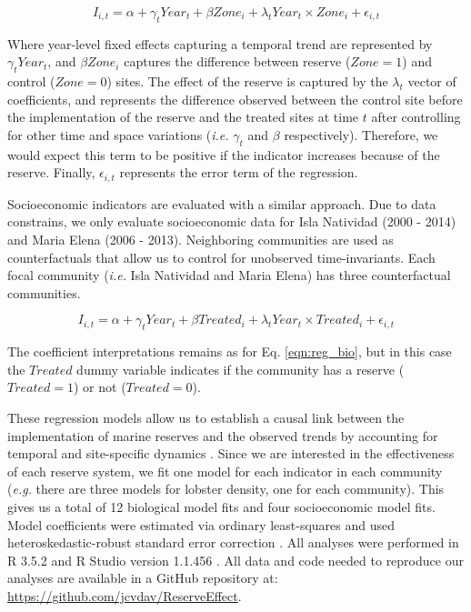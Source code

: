 \documentclass[10pt,letterpaper]{article}
\begin{document}
\begin{equation}
I_{i,t} = \alpha + \gamma_{t} Year_t + \beta Zone_i + \lambda_{t} Year_t\times Zone_i + \epsilon_{i,t}
\label{eqn:reg_bio}
\end{equation}

Where year-level fixed effects capturing a temporal trend are represented by $\gamma_t Year_t$, and $\beta Zone_i$ captures the difference between reserve ($Zone = 1$) and control ($Zone = 0$) sites. The effect of the reserve is captured by the $\lambda_t$ vector of coefficients, and represents the difference observed between the control site before the implementation of the reserve and the treated sites at time $t$ after controlling for other time and space variations (\emph{i.e.} $\gamma_t$ and $\beta$ respectively). Therefore, we would expect this term to be positive if the indicator increases because of the reserve. Finally, $\epsilon_{i,t}$ represents the error term of the regression.

Socioeconomic indicators are evaluated with a similar approach. Due to data constrains, we only evaluate socioeconomic data for Isla Natividad (2000 - 2014) and Maria Elena (2006 - 2013). Neighboring communities are used as counterfactuals that allow us to control for unobserved time-invariants. Each focal community (\emph{i.e.} Isla Natividad and Maria Elena) has three counterfactual communities.

\begin{equation}
I_{i,t} = \alpha + \gamma_{t} Year_t + \beta Treated_i + \lambda_{t} Year_t\times Treated_i +\epsilon_{i,t}
\label{eqn:soc_reg}
\end{equation}

The coefficient interpretations remains as for Eq. \ref{eqn:reg_bio}, but in this case the $Treated$ dummy variable indicates if the community has a reserve ($Treated = 1$) or not ($Treated = 0$).

These regression models allow us to establish a causal link between the implementation of marine reserves and the observed trends by accounting for temporal and site-specific dynamics \cite{depalma_2018}. Since we are interested in the effectiveness of each reserve system, we fit one model for each indicator in each community (\emph{e.g.} there are three models for lobster density, one for each community). This gives us a total of 12 biological model fits and four socioeconomic model fits. Model coefficients were estimated via ordinary least-squares and used heteroskedastic-robust standard error correction \cite{zeileis_2004-7n}. All analyses were performed in R 3.5.2 and R Studio version 1.1.456 \cite{R_2018}. All data and code needed to reproduce our analyses are available in a GitHub repository at: \url{https://github.com/jcvdav/ReserveEffect}.
\end{document}
